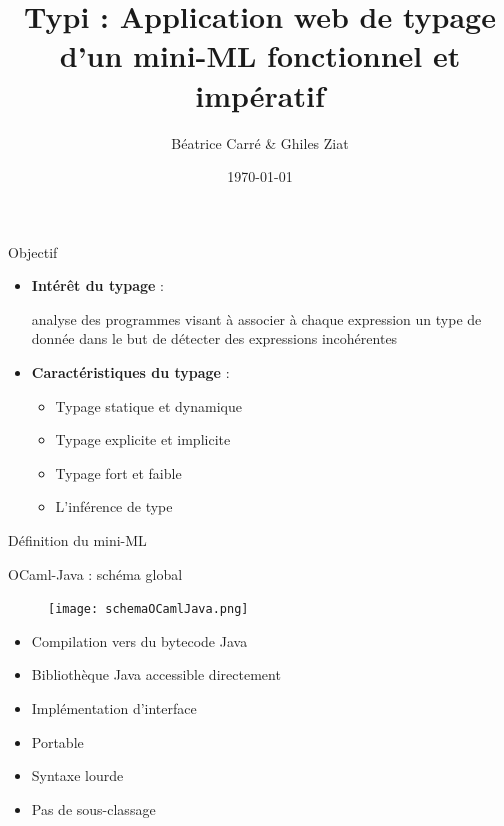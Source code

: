 \documentclass[xcolor={table,dvipsnames}]{beamer}
\title{Typi : Application web de typage d'un mini-ML fonctionnel et impératif}
\author{Béatrice Carré \& Ghiles Ziat}
\institute{Projet de Typage et Analyse Statique}
\date{\today}
\begin{document}
\maketitle







\begin{frame}{Objectif}

\begin{itemize}
\item \textbf{Intérêt du typage} :

  analyse des programmes visant à associer à chaque expression un type
de donnée dans le but de détecter des expressions incohérentes

\item \textbf{Caractéristiques du typage} : 
  
  \begin{itemize}
  \item Typage statique et dynamique
  \item Typage explicite et implicite
  \item Typage fort et faible
  \item L'inférence de type
  \end{itemize}

\end{itemize}
\end{frame}







\begin{frame}{Définition du mini-ML}

\end{frame}





\begin{frame}{OCaml-Java : schéma global}
\begin{figure}[h!]
  \centering
  \texttt{[image: schemaOCamlJava.png]}
\end{figure}

\begin{multicols}{2}
\begin{itemize}
\item Compilation vers du bytecode Java
\item Bibliothèque Java accessible directement
\item Implémentation d'interface
\item Portable
\end{itemize}
\bigskip
\begin{itemize}
\item Syntaxe lourde
\item Pas de sous-classage
\end{itemize}

\bigskip

\end{multicols}
\end{frame}
\end{document}
